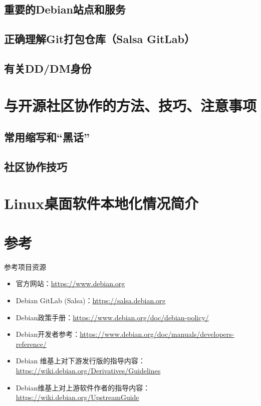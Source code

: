 \documentclass[aspectratio=169]{beamer}
\begin{document}


\subsection{重要的Debian站点和服务}



\subsection{正确理解Git打包仓库（Salsa GitLab）}



\subsection{有关DD/DM身份}


\section{与开源社区协作的方法、技巧、注意事项}

\subsection{常用缩写和“黑话”}


\subsection{社区协作技巧}


\section{Linux桌面软件本地化情况简介}



\section*{参考}
\begin{frame}[t]{参考}{项目资源}
\begin{itemize}
\item 官方网站：\url{https://www.debian.org}
\item Debian GitLab (Salsa)：\url{https://salsa.debian.org}
\item Debian政策手册：\url{https://www.debian.org/doc/debian-policy/}
\item Debian开发者参考：\url{https://www.debian.org/doc/manuals/developers-reference/}
\item Debian 维基上对下游发行版的指导内容：\url{https://wiki.debian.org/Derivatives/Guidelines}
\item Debian维基上对上游软件作者的指导内容：\url{https://wiki.debian.org/UpstreamGuide}
\end{itemize}
\end{frame}
\end{document}

